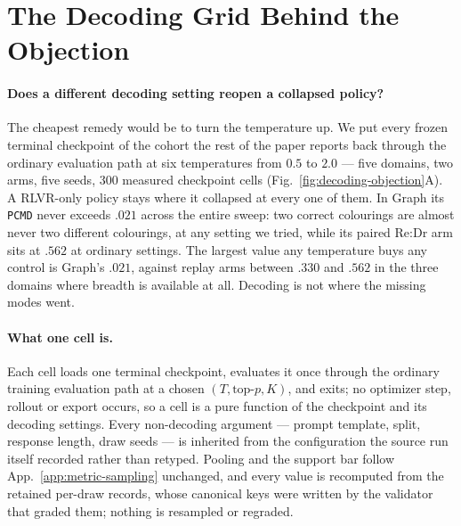 \documentclass{article}
\newcommand{\1}{\mathbf 1}
\newcommand{\pmd}{\texttt{PCMD}}
\theoremstyle{remark}
\theoremstyle{definition}
\theoremstyle{plain}
\begin{document}
\clearpage
\section{The Decoding Grid Behind the Objection}
\label{app:decoding-objection}

\paragraph{Does a different decoding setting reopen a collapsed policy?}
The cheapest remedy would be to turn the temperature up. We put every frozen
terminal checkpoint of the cohort the rest of the paper reports back through
the ordinary evaluation path at six temperatures from $0.5$ to $2.0$ --- five
domains, two arms, five seeds, 300 measured checkpoint cells
(Fig.~\ref{fig:decoding-objection}A). A RLVR-only policy stays where it
collapsed at every one of them. In Graph its \pmd{} never exceeds $.021$ across
the entire sweep: two correct colourings are almost never two different
colourings, at any setting we tried, while its paired Re:Dr arm sits at $.562$
at ordinary settings. The largest value any temperature buys any control is
Graph's $.021$, against replay arms between $.330$ and $.562$ in the three
domains where breadth is available at all. Decoding is not where the missing
modes went.


\paragraph{What one cell is.}
Each cell loads one terminal checkpoint, evaluates it once through the ordinary
training evaluation path at a chosen $(T,\text{top-}p,K)$, and exits; no
optimizer step, rollout or export occurs, so a cell is a pure function of the
checkpoint and its decoding settings. Every non-decoding argument --- prompt
template, split, response length, draw seeds --- is inherited from the
configuration the source run itself recorded rather than retyped. Pooling and
the support bar follow App.~\ref{app:metric-sampling} unchanged, and every value
is recomputed from the retained per-draw records, whose canonical keys were
written by the validator that graded them; nothing is resampled or regraded.
\end{document}

